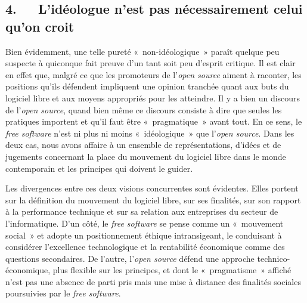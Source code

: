\documentclass{FramateX}
\begin{document}
\begin{refsection}
\section*{4.~~~L'idéologue n'est pas nécessairement celui qu'on croit}
{}

Bien évidemment, une telle pureté «~non-idéologique~» paraît quelque peu
suspecte à quiconque fait preuve d'un tant soit peu d'esprit critique.
Il est clair en effet que, malgré ce que les promoteurs de
l'\textit{open source} aiment à raconter, les positions qu'ils
défendent impliquent une opinion tranchée quant aux buts du logiciel
libre et aux moyens appropriés pour les atteindre. Il y a bien un
discours de l'\textit{open source}, quand bien même ce discours
consiste à dire que seules les pratiques importent et qu'il faut être
«~pragmatique~» avant tout. En ce sens, le \textit{free software} n'est
ni plus ni moins «~idéologique~» que l'\textit{open source}. Dans les
deux cas, nous avons affaire à un ensemble de représentations, d'idées
et de jugements concernant la place du mouvement du logiciel libre dans
le monde contemporain et les principes qui doivent le guider. 

Les divergences entre ces deux visions concurrentes sont évidentes.
Elles portent sur la définition du mouvement du logiciel libre, sur ses
finalités, sur son rapport à la performance technique et sur sa
relation aux entreprises du secteur de l'informatique. D'un côté, le
\textit{free software} se pense comme un «~mouvement social~» et adopte
un positionnement éthique intransigeant, le conduisant à considérer
l'excellence technologique et la rentabilité économique comme des
questions secondaires. De l'autre, l'\textit{open source} défend une
approche technico-économique, plus flexible sur les principes, et dont
le «~pragmatisme~» affiché n'est pas une absence de parti pris mais une
mise à distance des finalités sociales poursuivies par le \textit{free
software}.


\end{refsection}
\end{document}
